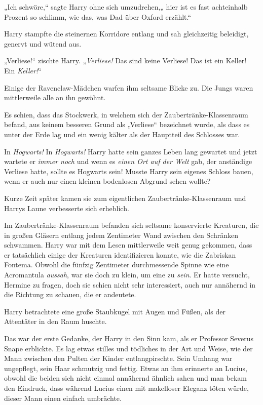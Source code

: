 {„Ich schwöre,“ sagte Harry ohne sich umzudrehen,„ hier ist es fast achteinhalb Prozent so schlimm, wie das, was Dad über Oxford erzählt.“

\later

Harry stampfte die steinernen Korridore entlang und sah gleichzeitig beleidigt, genervt und wütend aus.

„Verliese!“ zischte Harry. „\emph{Verliese!} Das sind keine Verliese! Das ist ein Keller! Ein \emph{Keller!}“

Einige der Ravenclaw-Mädchen warfen ihm seltsame Blicke zu. Die Jungs waren mittlerweile alle an ihn gewöhnt.

Es schien, dass das Stockwerk, in welchem sich der Zaubertränke-Klassenraum befand, aus keinem besseren Grund als „Verliese“ bezeichnet wurde, als dass es unter der Erde lag und ein wenig kälter als der Hauptteil des Schlosses war.

In \emph{Hogwarts!} In \emph{Hogwarts!} Harry hatte sein ganzes Leben lang gewartet und jetzt wartete er \emph{immer noch} und wenn es \emph{einen Ort auf der Welt} gab, der anständige Verliese hatte, sollte es Hogwarts sein! Musste Harry sein eigenes Schloss bauen, wenn er auch nur einen kleinen bodenlosen Abgrund sehen wollte?

Kurze Zeit später kamen sie zum eigentlichen Zaubertränke-Klassenraum und Harrys Laune verbesserte sich erheblich.

Im Zaubertränke-Klassenraum befanden sich seltsame konservierte Kreaturen, die in großen Gläsern entlang jedem Zentimeter Wand zwischen den Schränken schwammen. Harry war mit dem Lesen mittlerweile weit genug gekommen, dass er tatsächlich einige der Kreaturen identifizieren konnte, wie die Zabriskan Fontema. Obwohl die fünfzig Zentimeter durchmessende Spinne wie eine Acromantula \emph{aussah}, war sie doch zu klein, um eine zu \emph{sein}. Er hatte versucht, Hermine zu fragen, doch sie schien nicht sehr interessiert, auch nur annähernd in die Richtung zu schauen, die er andeutete.

Harry betrachtete eine große Staubkugel mit Augen und Füßen, als der Attentäter in den Raum huschte.

Das war der erste Gedanke, der Harry in den Sinn kam, als er Professor Severus Snape erblickte. Es lag etwas stilles und tödliches in der Art und Weise, wie der Mann zwischen den Pulten der Kinder entlangpirschte. Sein Umhang war ungepflegt, sein Haar schmutzig und fettig. Etwas an ihm erinnerte an Lucius, obwohl die beiden sich nicht einmal annähernd ähnlich sahen und man bekam den Eindruck, dass während Lucius einen mit makelloser Eleganz töten würde, dieser Mann einen einfach umbrächte.

}
